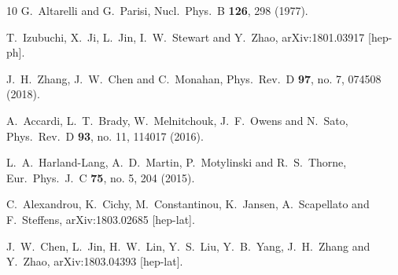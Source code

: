 \documentclass[aps,prd,twocolumn,showpacs,preprintnumbers,superscriptaddress]{revtex4-1}
\begin{document}
\begin{thebibliography}{10}
  G.~Altarelli and G.~Parisi,
  Nucl.\ Phys.\ B {\bf 126}, 298 (1977).


  T.~Izubuchi, X.~Ji, L.~Jin, I.~W.~Stewart and Y.~Zhao,
  arXiv:1801.03917 [hep-ph].


  J.~H.~Zhang, J.~W.~Chen and C.~Monahan,
  Phys.\ Rev.\ D {\bf 97}, no. 7, 074508 (2018).


  A.~Accardi, L.~T.~Brady, W.~Melnitchouk, J.~F.~Owens and N.~Sato,
  Phys.\ Rev.\ D {\bf 93}, no. 11, 114017 (2016).


  L.~A.~Harland-Lang, A.~D.~Martin, P.~Motylinski and R.~S.~Thorne,
  Eur.\ Phys.\ J.\ C {\bf 75}, no. 5, 204 (2015).


  C.~Alexandrou, K.~Cichy, M.~Constantinou, K.~Jansen, A.~Scapellato and F.~Steffens,
  arXiv:1803.02685 [hep-lat].
  
  J.~W.~Chen, L.~Jin, H.~W.~Lin, Y.~S.~Liu, Y.~B.~Yang, J.~H.~Zhang and Y.~Zhao,
  arXiv:1803.04393 [hep-lat].

\end{thebibliography}
\end{document}
